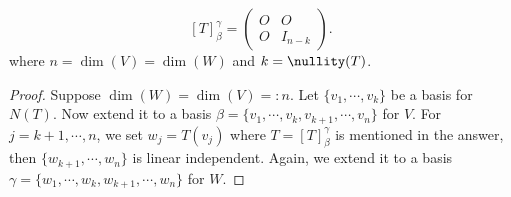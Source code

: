\begin{Exercise}
\begin{answer}
$$
[T]_{\beta}^{\gamma} = \begin{pmatrix}
O & O \\
O & I_{n-k}
\end{pmatrix}.
$$
where $n=\dim(V)=\dim(W)$ and $k=\nullity(T)$.
\end{answer}
\begin{proof}
Suppose $\dim(W) = \dim(V) =: n$. Let $\{v_1,\cdots,v_k\}$ be a basis for $N(T)$. Now extend it to a basis $\beta = \{v_1,\cdots,v_k,v_{k+1},\cdots,v_n\}$ for $V$. For $j=k+1,\cdots, n$, we set $w_j = T(v_j)$ where $T = [T]_{\beta}^{\gamma}$ is mentioned in the answer, then $\{w_{k+1},\cdots, w_n\}$ is linear independent. Again, we extend it to a basis $\gamma = \{w_1,\cdots, w_k,w_{k+1},\cdots,w_n\}$ for $W$.
\end{proof}
\end{Exercise}